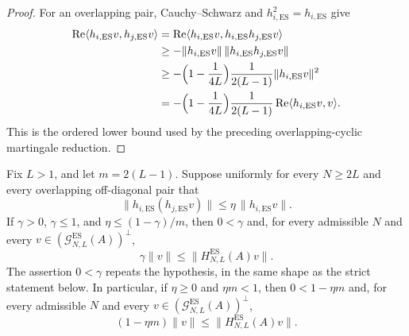 \begin{proof}
    \leanok
    For an overlapping pair, Cauchy--Schwarz and $h_{i,\mathrm{ES}}^2
    =h_{i,\mathrm{ES}}$ give
    \[
        \begin{aligned}
        \operatorname{Re}\langle h_{i,\mathrm{ES}}v,h_{j,\mathrm{ES}}v\rangle
        &=
        \operatorname{Re}\langle h_{i,\mathrm{ES}}v,
            h_{i,\mathrm{ES}}h_{j,\mathrm{ES}}v\rangle\\
        &\ge
        -\|h_{i,\mathrm{ES}}v\|\,
            \|h_{i,\mathrm{ES}}h_{j,\mathrm{ES}}v\|\\
        &\ge
        -\Bigl(1-\frac{1}{4L}\Bigr)\frac{1}{2(L-1)}
            \|h_{i,\mathrm{ES}}v\|^2\\
        &=
        -\Bigl(1-\frac{1}{4L}\Bigr)\frac{1}{2(L-1)}
            \operatorname{Re}\langle h_{i,\mathrm{ES}}v,v\rangle .
        \end{aligned}
    \]
    This is the ordered lower bound used by the preceding overlapping-cyclic
    martingale reduction.
\end{proof}

\begin{lemma}
    \label{lem:parent_hamiltonian_cyclic_overlap_norm_constant_gap}
    \leanok
    Fix $L>1$, and let $m=2(L-1)$. Suppose uniformly for every $N\ge2L$ and every
    overlapping off-diagonal pair that
    \[
        \|h_{i,\mathrm{ES}}(h_{j,\mathrm{ES}}v)\|
        \le \eta\,\|h_{i,\mathrm{ES}}v\|.
    \]
    If $\gamma>0$, $\gamma\le1$, and $\eta\le(1-\gamma)/m$, then $0<\gamma$
    and, for every admissible $N$ and every
    $v\in(\mathcal G_{N,L}^{\mathrm{ES}}(A))^\perp$,
    \[
        \gamma\|v\|\le \|H_{N,L}^{\mathrm{ES}}(A)v\|.
    \]
    The assertion $0<\gamma$ repeats the hypothesis, in the same shape as the
    strict statement below. In particular, if
    $\eta\ge0$ and $\eta m<1$, then $0<1-\eta m$ and, for every admissible $N$
    and every $v\in(\mathcal G_{N,L}^{\mathrm{ES}}(A))^\perp$,
    \[
        (1-\eta m)\|v\|\le \|H_{N,L}^{\mathrm{ES}}(A)v\|.
    \]
\end{lemma}

